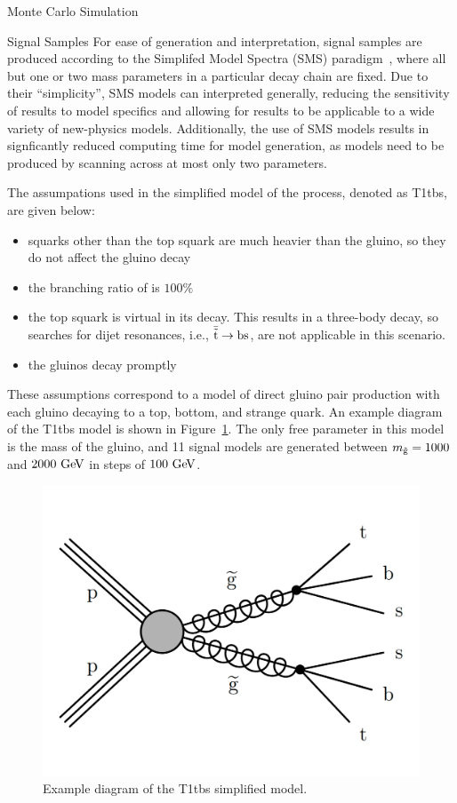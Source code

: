 \begin{section}{Monte Carlo Simulation}
\begin{subsection}{Signal Samples}
For ease of generation and interpretation, signal samples are produced according to the Simplifed Model Spectra (SMS) paradigm~\cite{Alwall:2008ag,Alves:2011wf}, where all but one or two mass parameters in a particular decay chain are fixed.
Due to their ``simplicity'', SMS models can interpreted generally, reducing the sensitivity of results to model specifics and allowing for results to be applicable to a wide variety of new-physics models.
Additionally, the use of SMS models results in signficantly reduced computing time for model generation, as models need to be produced by scanning across at most only two parameters.

The assumpations used in the simplified model of the \rpvDecay process, denoted as T1tbs, are given below:
\begin{itemize}
\item squarks other than the top squark are much heavier than the gluino, so they do not affect the gluino decay
\item the branching ratio of \rpvDecay is $100\%$
\item the top squark is virtual in its decay. This results in a three-body decay, so searches for dijet resonances, i.e., $\bar{\tilde{\mathrm{t}}} \to \mathrm{bs}$, are not applicable in this scenario.
\item the gluinos decay promptly
\end{itemize}

These assumptions correspond to a model of direct gluino pair production with each gluino decaying to a top, bottom, and strange quark. 
An example diagram of the T1tbs model is shown in Figure~\ref{fig:T1tbs_diagram}.
The only free parameter in this model is the mass of the gluino, and 11 signal models are generated between $m_{\tilde{\mathrm{g}}} = 1000$ and $2000~\mathrm{Ge\kern -0.1em V}$ in steps of $100~\mathrm{Ge\kern -0.1em V}$.

\begin{figure}[tbp!]
\begin{center}
\includegraphics[angle=0,width=0.60\columnwidth]{fig/T1tbs_diagram.png}
\end{center}
\caption{Example diagram of the T1tbs simplified model.}
\label{fig:T1tbs_diagram}
\end{figure}


\end{subsection}
\end{section}
